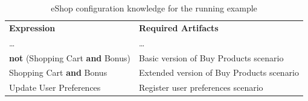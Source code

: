 \documentclass{acm_proc_article-sp}
\begin{document}
\begin{table}[h]
\begin{center}
\caption{eShop configuration knowledge for the running example} \label{tab:eshop-running-example}
\begin{tabular}{ll}
   \hline\noalign{\smallskip}
  {\bf Expression} & {\bf Required Artifacts} \\
   \noalign{\smallskip}
   \hline
   \noalign{\smallskip}
    \ldots & \ldots \\
    {\bf not} (Shopping Cart {\bf and} Bonus)\hspace{2pt} & Basic version of Buy Products scenario \\
    Shopping Cart {\bf and} Bonus & Extended version of Buy Products scenario \\
    Update User Preferences & Register user preferences scenario	 \\       
  \hline
\end{tabular}
\end{center}
\end{table}
\end{document}
